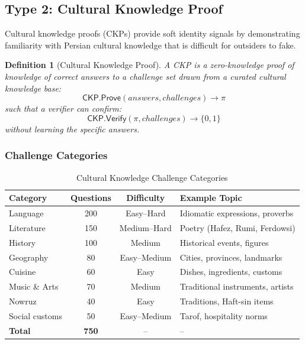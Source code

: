 \documentclass[11pt,a4paper]{article}
\newtheorem{definition}{Definition}
\begin{document}
\subsection{Type 2: Cultural Knowledge Proof}

Cultural knowledge proofs (CKPs) provide soft identity signals by demonstrating familiarity with Persian cultural knowledge that is difficult for outsiders to fake.

\begin{definition}[Cultural Knowledge Proof]
A CKP is a zero-knowledge proof of knowledge of correct answers to a challenge set drawn from a curated cultural knowledge base:
\begin{equation}
    \mathsf{CKP}.\mathsf{Prove}(\mathit{answers}, \mathit{challenges}) \rightarrow \pi
\end{equation}
such that a verifier can confirm:
\begin{equation}
    \mathsf{CKP}.\mathsf{Verify}(\pi, \mathit{challenges}) \rightarrow \{0, 1\}
\end{equation}
without learning the specific answers.
\end{definition}

\subsubsection{Challenge Categories}

\begin{table}[H]
\centering
\caption{Cultural Knowledge Challenge Categories}
\label{tab:ckp-categories}
\begin{tabular}{lccl}
\toprule
\textbf{Category} & \textbf{Questions} & \textbf{Difficulty} & \textbf{Example Topic} \\
\midrule
Language & 200 & Easy--Hard & Idiomatic expressions, proverbs \\
Literature & 150 & Medium--Hard & Poetry (Hafez, Rumi, Ferdowsi) \\
History & 100 & Medium & Historical events, figures \\
Geography & 80 & Easy--Medium & Cities, provinces, landmarks \\
Cuisine & 60 & Easy & Dishes, ingredients, customs \\
Music \& Arts & 70 & Medium & Traditional instruments, artists \\
Nowruz & 40 & Easy & Traditions, Haft-sin items \\
Social customs & 50 & Easy--Medium & Tarof, hospitality norms \\
\midrule
\textbf{Total} & \textbf{750} & -- & -- \\
\bottomrule
\end{tabular}
\end{table}
\end{document}
